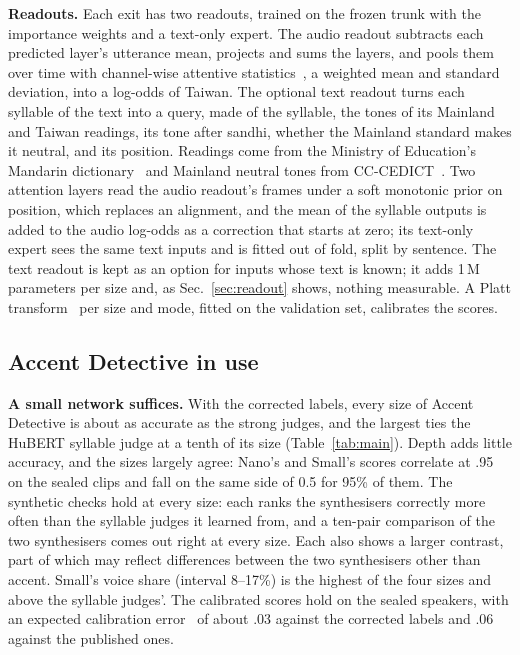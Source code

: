 \documentclass{Interspeech}
\begin{document}
\textbf{Readouts.} Each exit has two readouts, trained on the frozen trunk with the importance weights and a text-only expert. The audio readout subtracts each predicted layer's utterance mean, projects and sums the layers, and pools them over time with channel-wise attentive statistics~\cite{okabe2018attentive}, a weighted mean and standard deviation, into a log-odds of Taiwan. The optional text readout turns each syllable of the text into a query, made of the syllable, the tones of its Mainland and Taiwan readings, its tone after sandhi, whether the Mainland standard makes it neutral, and its position. Readings come from the Ministry of Education's Mandarin dictionary~\cite{moe_concised} and Mainland neutral tones from CC-CEDICT~\cite{cedict}. Two attention layers read the audio readout's frames under a soft monotonic prior on position, which replaces an alignment, and the mean of the syllable outputs is added to the audio log-odds as a correction that starts at zero; its text-only expert sees the same text inputs and is fitted out of fold, split by sentence. The text readout is kept as an option for inputs whose text is known; it adds 1\,M parameters per size and, as Sec.~\ref{sec:readout} shows, nothing measurable. A Platt transform~\cite{platt1999probabilistic} per size and mode, fitted on the validation set, calibrates the scores.

\subsection{Accent Detective in use}
\label{sec:use}

\textbf{A small network suffices.} With the corrected labels, every size of Accent Detective is about as accurate as the strong judges, and the largest ties the HuBERT syllable judge at a tenth of its size (Table~\ref{tab:main}). Depth adds little accuracy, and the sizes largely agree: Nano's and Small's scores correlate at .95 on the sealed clips and fall on the same side of 0.5 for 95\% of them. The synthetic checks hold at every size: each ranks the synthesisers correctly more often than the syllable judges it learned from, and a ten-pair comparison of the two synthesisers comes out right at every size. Each also shows a larger contrast, part of which may reflect differences between the two synthesisers other than accent. Small's voice share (interval 8--17\%) is the highest of the four sizes and above the syllable judges'. The calibrated scores hold on the sealed speakers, with an expected calibration error~\cite{guo2017calibration} of about .03 against the corrected labels and .06 against the published ones.
\end{document}
